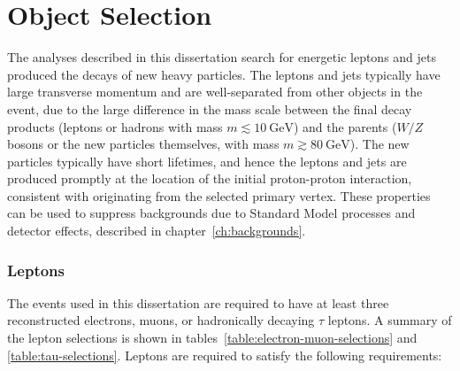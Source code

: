 \section{Object Selection}\label{sec:model-independent-object-definitions}
The analyses described in this dissertation search for energetic leptons and jets produced the decays of new heavy particles. The leptons and jets typically have large transverse momentum and are well-separated from other objects in the event, due to the large difference in the mass scale between the final decay products (leptons or hadrons with mass $m\lesssim\SI{10}{\giga\electronvolt}$) and the parents ($W/Z$ bosons or the new particles themselves, with mass $m\gtrsim\SI{80}{\giga\electronvolt}$). The new particles typically have short lifetimes, and hence the leptons and jets are produced promptly at the location of the initial proton-proton interaction, consistent with originating from the selected primary vertex. These properties can be used to suppress backgrounds due to Standard Model processes and detector effects, described in chapter~\ref{ch:backgrounds}. 

\subsubsection{Leptons}\label{sec:model-independent-lepton-definitions}

The events used in this dissertation are required to have at least three reconstructed electrons, muons, or hadronically decaying $\tau$ leptons. A summary of the lepton selections is shown in tables~\ref{table:electron-muon-selections} and \ref{table:tau-selections}. Leptons are required to satisfy the following requirements:

